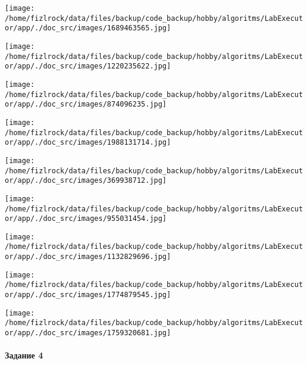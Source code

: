 \documentclass[a4paper, 12pt]{article}
\begin{document}
\texttt{[image: /home/fizlrock/data/files/backup/code\_backup/hobby/algoritms/LabExecutor/app/./doc\_src/images/1689463565.jpg]}

\texttt{[image: /home/fizlrock/data/files/backup/code\_backup/hobby/algoritms/LabExecutor/app/./doc\_src/images/1220235622.jpg]}

\texttt{[image: /home/fizlrock/data/files/backup/code\_backup/hobby/algoritms/LabExecutor/app/./doc\_src/images/874096235.jpg]}

\texttt{[image: /home/fizlrock/data/files/backup/code\_backup/hobby/algoritms/LabExecutor/app/./doc\_src/images/1988131714.jpg]}

\texttt{[image: /home/fizlrock/data/files/backup/code\_backup/hobby/algoritms/LabExecutor/app/./doc\_src/images/369938712.jpg]}

\texttt{[image: /home/fizlrock/data/files/backup/code\_backup/hobby/algoritms/LabExecutor/app/./doc\_src/images/955031454.jpg]}

\texttt{[image: /home/fizlrock/data/files/backup/code\_backup/hobby/algoritms/LabExecutor/app/./doc\_src/images/1132829696.jpg]}

\texttt{[image: /home/fizlrock/data/files/backup/code\_backup/hobby/algoritms/LabExecutor/app/./doc\_src/images/1774879545.jpg]}

\texttt{[image: /home/fizlrock/data/files/backup/code\_backup/hobby/algoritms/LabExecutor/app/./doc\_src/images/1759320681.jpg]}
\pagebreak
\paragraph{Задание 4}
\end{document}
